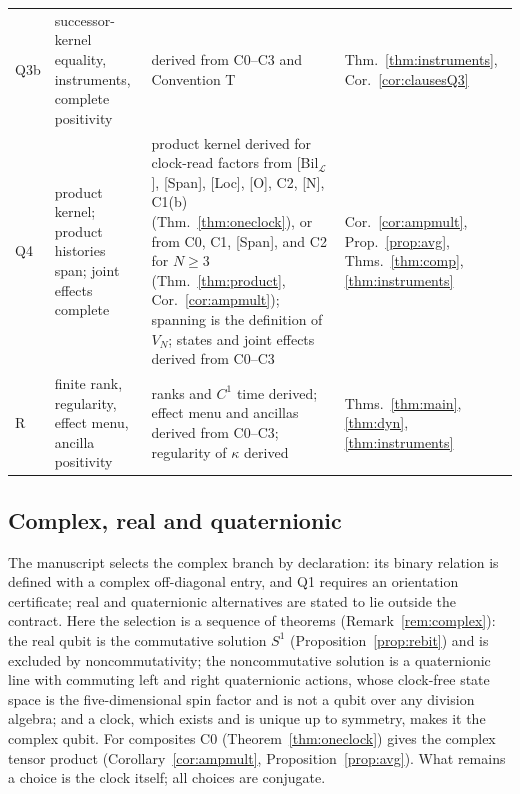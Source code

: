 \documentclass[aps,pra,onecolumn,superscriptaddress,nofootinbib,10pt]{revtex4-2}
\theoremstyle{definition}
\theoremstyle{remark}
\newcommand{\cL}{\mathcal{L}}
\begin{document}
\begin{table}[h]
\begin{tabular}{@{}p{}p{}p{}p{}@{}}
\textsf{Q3b} & successor-kernel equality, instruments, complete positivity & derived from C0--C3 and Convention T & Thm.~\ref{thm:instruments}, Cor.~\ref{cor:clausesQ3}\\
\textsf{Q4} & product kernel; product histories span; joint effects complete & product kernel derived for clock-read factors from [Bil$_\cL$], [Span], [Loc], [O], C2, [N], C1(b) (Thm.~\ref{thm:oneclock}), or from C0, C1, [Span], and C2 for $N\ge3$ (Thm.~\ref{thm:product}, Cor.~\ref{cor:ampmult}); spanning is the definition of $V_N$; states and joint effects derived from C0--C3 & Cor.~\ref{cor:ampmult}, Prop.~\ref{prop:avg}, Thms.~\ref{thm:comp}, \ref{thm:instruments}\\
R & finite rank, regularity, effect menu, ancilla positivity & ranks and $C^1$ time derived; effect menu and ancillas derived from C0--C3; regularity of $\kappa$ derived \cite[Thm.~3.11]{PaperI} & Thms.~\ref{thm:main}, \ref{thm:dyn}, \ref{thm:instruments}\\
\bottomrule
\end{tabular}
\end{table}

\subsection{Complex, real and quaternionic}
The manuscript \cite{CRQO} selects the complex branch by declaration: its binary relation is defined with a complex
off-diagonal entry, and \textsf{Q1} requires an orientation certificate; real and quaternionic alternatives are
stated to lie outside the contract.  Here the selection is a sequence of theorems
(Remark~\ref{rem:complex}): the real qubit is the commutative solution $S^1$
(Proposition~\ref{prop:rebit}) and is excluded by noncommutativity; the noncommutative solution is a
quaternionic line with commuting left and right quaternionic actions, whose clock-free state space is
the five-dimensional spin factor and is not a qubit over any division algebra; and a clock, which
exists and is unique up to symmetry, makes it the complex qubit.  For composites
C0 (Theorem~\ref{thm:oneclock}) gives the complex tensor product (Corollary~\ref{cor:ampmult},
Proposition~\ref{prop:avg}).  What remains a
choice is the clock itself; all choices are conjugate.
\end{document}
